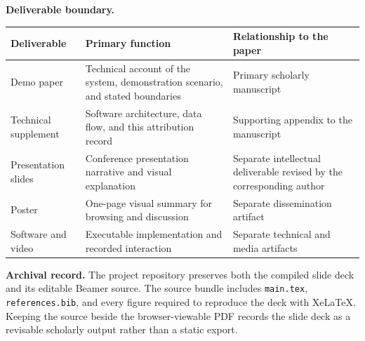 \documentclass[10pt,letterpaper]{article}
\begin{document}
\vspace{14pt}
\noindent\textbf{Deliverable boundary.}
\vspace{4pt}

\renewcommand{\arraystretch}{1.22}
\noindent
\begin{tabularx}{\textwidth}{>{\raggedright\arraybackslash}p{}
  >{\raggedright\arraybackslash}p{}X}
\toprule
\textbf{Deliverable} & \textbf{Primary function} & \textbf{Relationship to the paper} \\
\midrule
Demo paper & Technical account of the system, demonstration scenario, and stated boundaries & Primary scholarly manuscript \\
Technical supplement & Software architecture, data flow, and this attribution record & Supporting appendix to the manuscript \\
Presentation slides & Conference presentation narrative and visual explanation & Separate intellectual deliverable revised by the corresponding author \\
Poster & One-page visual summary for browsing and discussion & Separate dissemination artifact \\
Software and video & Executable implementation and recorded interaction & Separate technical and media artifacts \\
\bottomrule
\end{tabularx}

\vspace{14pt}
\noindent\textbf{Archival record.}
The project repository preserves both the compiled slide deck and its editable
Beamer source. The source bundle includes \texttt{main.tex},
\texttt{references.bib}, and every figure required to reproduce the deck with
XeLaTeX. Keeping the source beside the browser-viewable PDF records the slide
deck as a revisable scholarly output rather than a static export.
\end{document}
